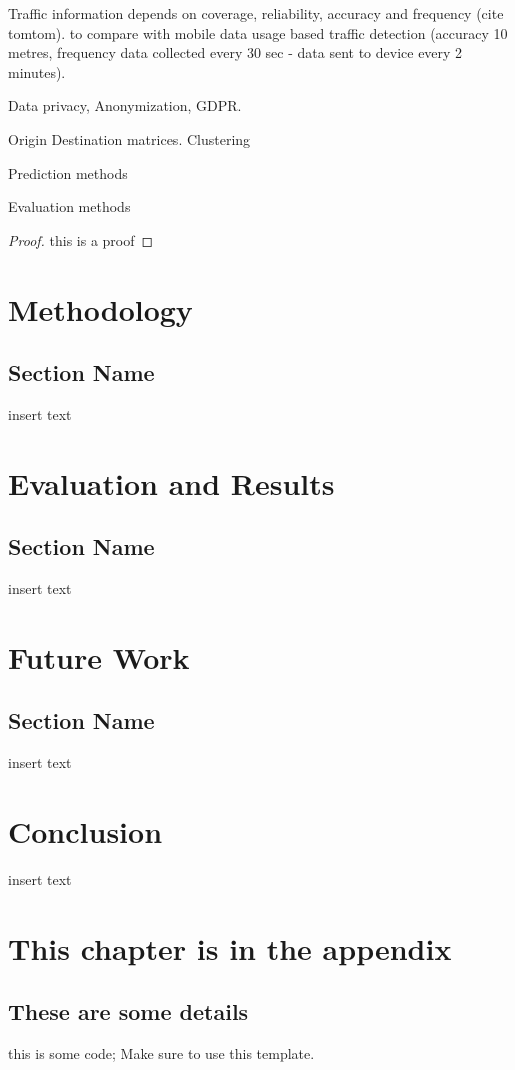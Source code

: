 \documentclass[12pt, a4paper]{report}
\newenvironment{code}
{\footnotesize\verbatim}{\endverbatim\normalfont}
\theoremstyle{definition}
\theoremstyle{definition}%
\theoremstyle{definition}%
\theoremstyle{definition}%
\theoremstyle{definition}%
\theoremstyle{definition}%
\begin{document}
Traffic information depends on coverage, reliability, accuracy and frequency (cite tomtom).
to compare with mobile data usage based traffic detection (accuracy 10 metres, frequency data collected every 30 sec - data sent to device every 2 minutes). 



Data privacy, Anonymization, GDPR.


Origin Destination matrices.
Clustering



Prediction methods


Evaluation methods


\begin{proof}
this is a proof
\end{proof}

\chapter{Methodology}
\section{Section Name}
insert text

\chapter{Evaluation and Results}
\section{Section Name}
insert text

\chapter{Future Work}
\section{Section Name}
insert text

\chapter{Conclusion}
insert text

\appendix

\chapter{This chapter is in the appendix}
\section{These are some details}
\begin{code}
this is some code;
Make sure to use this template.
\end{code}


\bibliomatter

 
 
\end{document}
